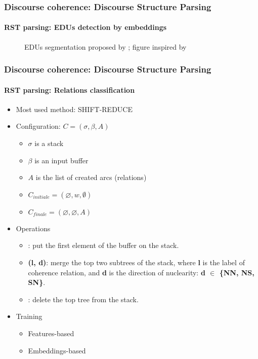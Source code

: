 \documentclass[xcolor=table]{beamer}
\begin{document}
\begin{frame}
	\frametitle{Discourse coherence: Discourse Structure Parsing}
	\framesubtitle{RST parsing: EDUs detection by embeddings}
	
	\begin{figure}
		\centering
		\caption{EDUs segmentation proposed by \cite{2018-wang-al}; figure inspired by \cite{2019-jurafsky-martin}}
	\end{figure}
	
\end{frame}

\begin{frame}
	\frametitle{Discourse coherence: Discourse Structure Parsing}
	\framesubtitle{RST parsing: Relations classification}
	
	\begin{minipage}{.6\textwidth}
	\begin{itemize}
		\item Most used method: SHIFT-REDUCE
		\item Configuration: $C = (\sigma, \beta, A)$
		\begin{itemize}
			\item $\sigma$ is a stack
			\item $\beta$ is an input buffer
			\item $A$ is the list of created arcs (relations)
			\item $C_{initiale} = (\varnothing, w, \emptyset)$
			\item $C_{finale} = (\varnothing, \varnothing, A)$
		\end{itemize}
	\end{itemize}
	\end{minipage}
	\begin{minipage}{.38\textwidth}
	\end{minipage}
	\begin{itemize}
		\item Operations 
		\begin{itemize}
			\item {}: put the first element of the buffer on the stack.
			\item {}\textbf{(l, d)}: merge the top two subtrees of the stack, where \textbf{l} is the label of coherence relation, and \textbf{d} is the direction of nuclearity: \textbf{d $ \in $ \{NN, NS, SN\}}.
			\item {}: delete the top tree from the stack.
		\end{itemize}
		\item Training 
		\begin{itemize}
			\item Features-based
			\item Embeddings-based
		\end{itemize}
	\end{itemize}
	
\end{frame}
\end{document}
